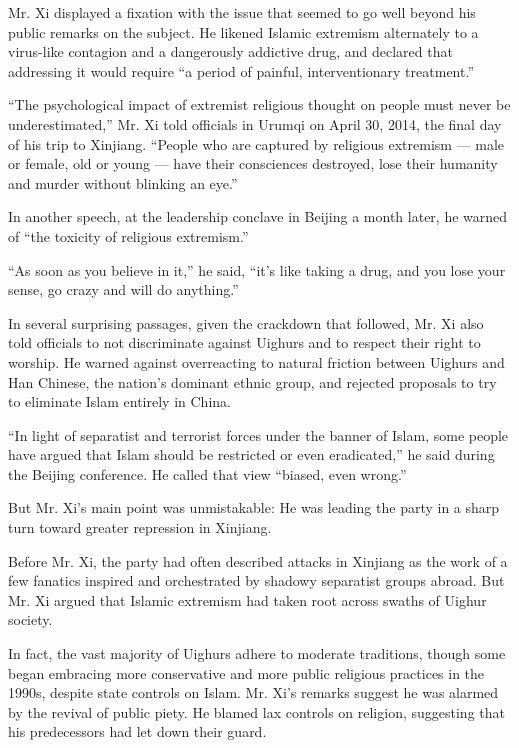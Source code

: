 Mr. Xi displayed a fixation with the issue that seemed to go well beyond
his public remarks on the subject. He likened Islamic extremism
alternately to a virus-like contagion and a dangerously addictive drug,
and declared that addressing it would require ``a period of painful,
interventionary treatment.''

``The psychological impact of extremist religious thought on people must
never be underestimated,'' Mr. Xi told officials in Urumqi on April 30,
2014, the final day of his trip to Xinjiang. ``People who are captured
by religious extremism --- male or female, old or young --- have their
consciences destroyed, lose their humanity and murder without blinking
an eye.''

In another speech, at the leadership conclave in Beijing a month later,
he warned of ``the toxicity of religious extremism.''

``As soon as you believe in it,'' he said, ``it's like taking a drug,
and you lose your sense, go crazy and will do anything.''

In several surprising passages, given the crackdown that followed, Mr.
Xi also told officials to not discriminate against Uighurs and to
respect their right to worship. He warned against overreacting to
natural friction between Uighurs and Han Chinese, the nation's dominant
ethnic group, and rejected proposals to try to eliminate Islam entirely
in China.

``In light of separatist and terrorist forces under the banner of Islam,
some people have argued that Islam should be restricted or even
eradicated,'' he said during the Beijing conference. He called that view
``biased, even wrong.''

But Mr. Xi's main point was unmistakable: He was leading the party in a
sharp turn toward greater repression in Xinjiang.

Before Mr. Xi, the party had often described attacks in Xinjiang as the
work of a few fanatics inspired and orchestrated by shadowy separatist
groups abroad. But Mr. Xi argued that Islamic extremism had taken root
across swaths of Uighur society.

In fact, the vast majority of Uighurs adhere to moderate traditions,
though some began embracing more conservative and more public religious
practices in the 1990s, despite state controls on Islam. Mr. Xi's
remarks suggest he was alarmed by the revival of public piety. He blamed
lax controls on religion, suggesting that his predecessors had let down
their guard.

